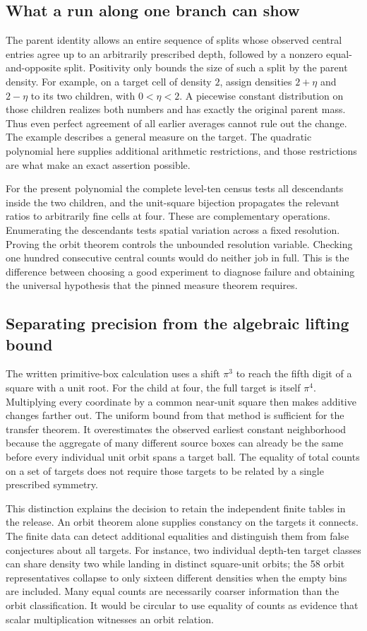 \documentclass[12pt,letterpaper]{article}
\begin{document}
\subsection{What a run along one branch can show}
The parent identity allows an entire sequence of splits whose observed central entries agree up to an arbitrarily prescribed depth, followed by a nonzero equal-and-opposite split. Positivity only bounds the size of such a split by the parent density. For example, on a target cell of density $2$, assign densities $2+\eta$ and $2-\eta$ to its two children, with $0<\eta<2$. A piecewise constant distribution on those children realizes both numbers and has exactly the original parent mass. Thus even perfect agreement of all earlier averages cannot rule out the change. The example describes a general measure on the target. The quadratic polynomial here supplies additional arithmetic restrictions, and those restrictions are what make an exact assertion possible.
\par
For the present polynomial the complete level-ten census tests all descendants inside the two children, and the unit-square bijection propagates the relevant ratios to arbitrarily fine cells at four. These are complementary operations. Enumerating the descendants tests spatial variation across a fixed resolution. Proving the orbit theorem controls the unbounded resolution variable. Checking one hundred consecutive central counts would do neither job in full. This is the difference between choosing a good experiment to diagnose failure and obtaining the universal hypothesis that the pinned measure theorem requires.
\subsection{Separating precision from the algebraic lifting bound}
The written primitive-box calculation uses a shift $\pi^3$ to reach the fifth digit of a square with a unit root. For the child at four, the full target is itself $\pi^4$. Multiplying every coordinate by a common near-unit square then makes additive changes farther out. The uniform bound from that method is sufficient for the transfer theorem. It overestimates the observed earliest constant neighborhood because the aggregate of many different source boxes can already be the same before every individual unit orbit spans a target ball. The equality of total counts on a set of targets does not require those targets to be related by a single prescribed symmetry.
\par
This distinction explains the decision to retain the independent finite tables in the release. An orbit theorem alone supplies constancy on the targets it connects. The finite data can detect additional equalities and distinguish them from false conjectures about all targets. For instance, two individual depth-ten target classes can share density two while landing in distinct square-unit orbits; the 58 orbit representatives collapse to only sixteen different densities when the empty bins are included. Many equal counts are necessarily coarser information than the orbit classification. It would be circular to use equality of counts as evidence that scalar multiplication witnesses an orbit relation.
\end{document}
